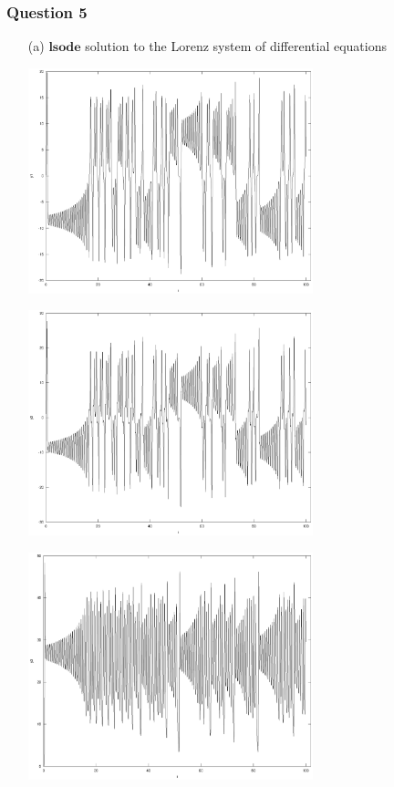 \documentclass[11pt,a4paper]{article}
\begin{document}
\subsubsection*{Question 5}
\begin{enumerate}
	\item[(a)] $\textbf{lsode}$ solution to the Lorenz system of differential equations
	\begin{center}
		\includegraphics[width=0.65\textwidth]{y1.eps}
	\end{center}
	\begin{center}
		\includegraphics[width=0.65\textwidth]{y2.eps}
	\end{center}
	\begin{center}
		\includegraphics[width=0.65\textwidth]{y3.eps}
	\end{center}
	\pagebreak
	

\end{enumerate}
\end{document}
